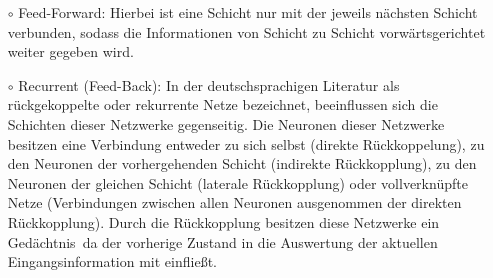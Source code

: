 \begin{itemize}
\item[\textbf{$\circ$}] Feed-Forward: Hierbei ist eine Schicht nur mit der jeweils nächsten Schicht verbunden, sodass die Informationen von Schicht zu Schicht vorwärtsgerichtet weiter gegeben wird.

\item[\textbf{$\circ$}] Recurrent (Feed-Back): In der deutschsprachigen Literatur als rückgekoppelte oder rekurrente Netze bezeichnet, beeinflussen sich die Schichten dieser Netzwerke gegenseitig. Die Neuronen dieser Netzwerke besitzen eine Verbindung entweder zu sich selbst (direkte Rückkoppelung), zu den Neuronen der vorhergehenden Schicht (indirekte Rückkopplung), zu den Neuronen der gleichen Schicht (laterale Rückkopplung) oder vollverknüpfte Netze (Verbindungen zwischen allen Neuronen ausgenommen der direkten Rückkopplung). Durch die Rückkopplung besitzen diese Netzwerke ein \glqq Gedächtnis\grqq~da der vorherige Zustand in die Auswertung der aktuellen Eingangsinformation mit einfließt.
\end{itemize}



